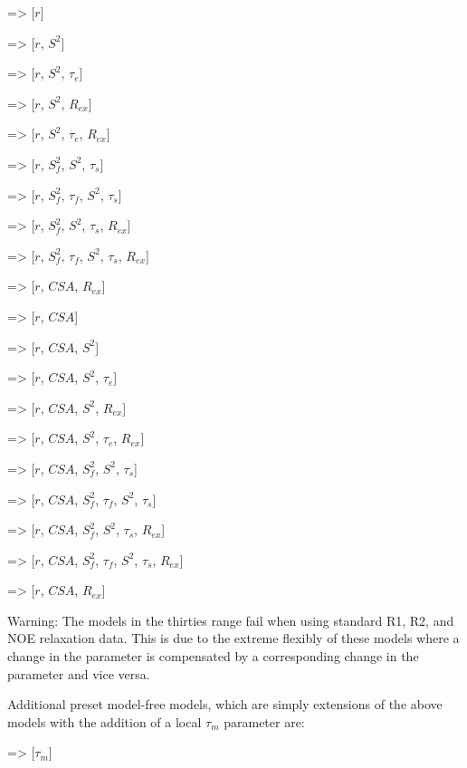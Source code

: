     
   => [$r$]
    
   => [$r$, $S^2$]
    
   => [$r$, $S^2$, $\tau_e$]
    
   => [$r$, $S^2$, $R_{ex}$]
    
   => [$r$, $S^2$, $\tau_e$, $R_{ex}$]
    
   => [$r$, $S^2_f$, $S^2$, $\tau_s$]
    
   => [$r$, $S^2_f$, $\tau_f$, $S^2$, $\tau_s$]
    
   => [$r$, $S^2_f$, $S^2$, $\tau_s$, $R_{ex}$]
    
   => [$r$, $S^2_f$, $\tau_f$, $S^2$, $\tau_s$, $R_{ex}$]
    
   => [$r$, $CSA$, $R_{ex}$]

    
   => [$r$, $CSA$]
    
   => [$r$, $CSA$, $S^2$]
    
   => [$r$, $CSA$, $S^2$, $\tau_e$]
    
   => [$r$, $CSA$, $S^2$, $R_{ex}$]
    
   => [$r$, $CSA$, $S^2$, $\tau_e$, $R_{ex}$]
    
   => [$r$, $CSA$, $S^2_f$, $S^2$, $\tau_s$]
    
   => [$r$, $CSA$, $S^2_f$, $\tau_f$, $S^2$, $\tau_s$]
    
   => [$r$, $CSA$, $S^2_f$, $S^2$, $\tau_s$, $R_{ex}$]
    
   => [$r$, $CSA$, $S^2_f$, $\tau_f$, $S^2$, $\tau_s$, $R_{ex}$]
    
   => [$r$, $CSA$, $R_{ex}$]

Warning:  The models in the thirties range fail when using standard R1, R2, and NOE
relaxation data.  This is due to the extreme flexibly of these models where a change in the
parameter 
 is compensated by a corresponding change in the parameter 
 and
vice versa.


Additional preset model-free models, which are simply extensions of the above models with
the addition of a local $\tau_m$ parameter are:
    
   => [$\tau_m$]
    
